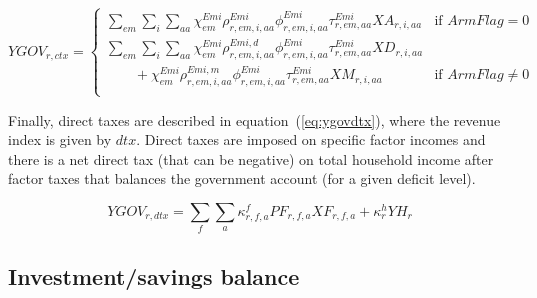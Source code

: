 \documentclass[11pt,letterpaper]{report}
\begin{document}
\begin{equation}
\label{eq:ygovctx}
\mathit{YGOV}_{r,ctx} =
\left\{
   \begin{array}{*{20}{l}}
      \displaystyle \sum_{\mathit{em}} { \sum_{i} {\sum_{\mathit{aa}} {
         \chi^{\mathit{Emi}}_{\mathit{em}}
         \rho^{\mathit{Emi}}_{r,\mathit{em},i,\mathit{aa}}
         \phi^{\mathit{Emi}}_{r,\mathit{em},i,\mathit{aa}}
            \tau^{\mathit{Emi}}_{r,\mathit{em},\mathit{aa}} \mathit{XA}_{r,i,aa}
      }}}
      & \textrm{if } \mathit{ArmFlag} = 0 \\
      \displaystyle \sum_{\mathit{em}} { \sum_{i} {\sum_{\mathit{aa}} {
         \chi^{\mathit{Emi}}_{\mathit{em}}
         \rho^{\mathit{Emi,d}}_{r,\mathit{em},i,\mathit{aa}}
         \phi^{\mathit{Emi}}_{r,\mathit{em},i,\mathit{aa}}
         \tau^{\mathit{Emi}}_{r,\mathit{em},\mathit{aa}}
            \mathit{XD}_{r,i,aa} }}} \\
      \qquad \displaystyle
      +  {\chi^{\mathit{Emi}}_{\mathit{em}}
            \rho^{\mathit{Emi,m}}_{r,\mathit{em},i,\mathit{aa}}
            \phi^{\mathit{Emi}}_{r,\mathit{em},i,\mathit{aa}}
            \tau^{\mathit{Emi}}_{r,\mathit{em},\mathit{aa}}\mathit{XM}_{r,i,aa}
         }
      & \textrm{if } \mathit{ArmFlag} \ne 0 \\
\end{array}
\right.
\end{equation}

Finally, direct taxes are described in equation~(\ref{eq:ygovdtx}), where the
revenue index is given by $\mathit{dtx}$. Direct taxes are imposed on specific
factor incomes and there is a net direct tax (that can be negative) on total
household income after factor taxes that balances the government account (for a
given deficit level).

\begin{equation}
\label{eq:ygovdtx}
\mathit{YGOV}_{r,dtx} =
   \sum_f {  \sum_a{
      \kappa^f_{r,f,a} \mathit{PF}_{r,f,a} \mathit{XF}_{r,f,a}
   }}
   + \kappa^h_r \mathit{YH}_r
\end{equation}

\subsection{Investment/savings balance}
\end{document}
